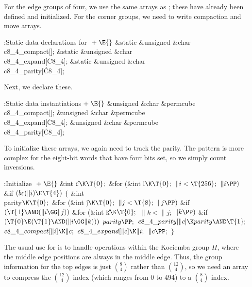 For the edge groups of four, we use the same arrays as ;
these have already been defined and initialized.  For the corner
groups, we need to write compaction and move arrays.

\Y\B\4:Static data declarations for \X${}\mathrel+\E{}$\6
\&{static} \&{unsigned} \&{char} \\{c8\_4\_compact}[];\6
\&{static} \&{unsigned} \&{char} \\{c8\_4\_expand}[\.{C8\_4}];\6
\&{static} \&{unsigned} \&{char} \\{c8\_4\_parity}[\.{C8\_4}];\par
\fi

Next, we declare these.

\Y\B\4:Static data instantiations\X${}\mathrel+\E{}$\6
\&{unsigned} \&{char} \&{permcube}\DC\\{c8\_4\_compact}[];\6
\&{unsigned} \&{char} \&{permcube}\DC\\{c8\_4\_expand}[\.{C8\_4}];\6
\&{unsigned} \&{char} \&{permcube}\DC\\{c8\_4\_parity}[\.{C8\_4}];\par
\fi

To initialize these arrays, we again need to track the parity.  The
pattern is more complex for the eight-bit words that have four bits
set, so we simply count inversions.

\Y\B\4:Initialize \X${}\mathrel+\E{}$\6
\&{int} \|c${}\K\T{0};{}$\7
\&{for} (\&{int} \|i${}\K\T{0};{}$ ${}\|i<\T{256};{}$ ${}\|i\PP){}$\1\6
\&{if} ${}(\\{bc}(\|i)\E\T{4}){}$\5
${}\{{}$\1\6
\&{int} \\{parity}${}\K\T{0};{}$\7
\&{for} (\&{int} \|j${}\K\T{0};{}$ ${}\|j<\T{8};{}$ ${}\|j\PP){}$\1\6
\&{if} ${}(\T{1}\AND(\|i\GG\|j)){}$\1\6
\&{for} (\&{int} \|k${}\K\T{0};{}$ ${}\|k<\|j;{}$ ${}\|k\PP){}$\1\6
\&{if} ${}(\T{0}\E(\T{1}\AND(\|i\GG\|k))){}$\1\5
${}\\{parity}\PP;{}$\2\2\2\2\6
${}\\{c8\_4\_parity}[\|c]\K\\{parity}\AND\T{1};{}$\6
${}\\{c8\_4\_compact}[\|i]\K\|c;{}$\6
${}\\{c8\_4\_expand}[\|c]\K\|i;{}$\6
${}\|c\PP;{}$\6
\4${}\}{}$\2\2\par
\fi

The usual use for  is to handle operations within the
Kociemba group $H$, where the middle edge positions are always in the
middle edge.  Thus, the group information for the top edges is just
$8\choose 4$ rather than $12\choose 4$, so we need an array to
compress the $12\choose 4$ index (which ranges from 0 to 494) to a
$8\choose 4$ index.

